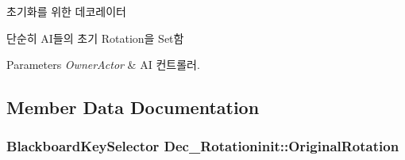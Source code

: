 초기화를 위한 데코레이터 

단순히 A\+I들의 초기 Rotation을 Set함 
\begin{DoxyParams}{Parameters}
{\em Owner\+Actor} & AI 컨트롤러. \\
\hline
\end{DoxyParams}


\subsection{Member Data Documentation}
\subsubsection[{\texorpdfstring{Original\+Rotation}{OriginalRotation}}]{\setlength{\rightskip}{0pt plus 5cm}Blackboard\+Key\+Selector Dec\+\_\+\+Rotationinit\+::\+Original\+Rotation}\hypertarget{class_dec___rotationinit_a44b74e55ce2973723fe045806169c6c0}{}\label{class_dec___rotationinit_a44b74e55ce2973723fe045806169c6c0}

